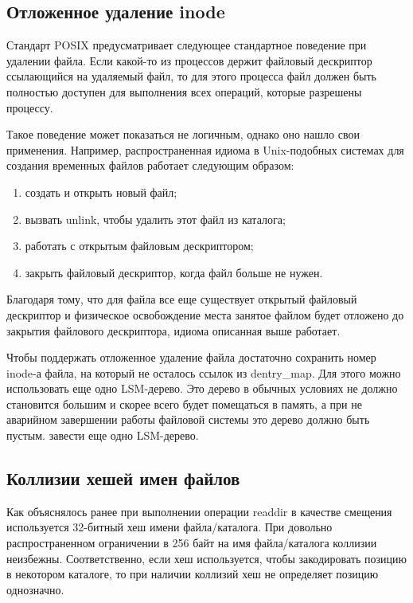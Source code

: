 \subsection{Отложенное удаление inode}

Стандарт POSIX предусматривает следующее стандартное поведение при удалении
файла. Если какой-то из процессов держит файловый дескриптор ссылающийся на
удаляемый файл, то для этого процесса файл должен быть полностью доступен для
выполнения всех операций, которые разрешены процессу.

Такое поведение может показаться не логичным, однако оно нашло свои применения.
Например, распространенная идиома в Unix-подобных системах для создания
временных файлов работает следующим образом:
\begin{enumerate}
  \item создать и открыть новый файл;
  \item вызвать unlink, чтобы удалить этот файл из каталога;
  \item работать с открытым файловым дескриптором;
  \item закрыть файловый дескриптор, когда файл больше не нужен.
\end{enumerate}

Благодаря тому, что для файла все еще существует открытый файловый дескриптор
и физическое освобождение места занятое файлом будет отложено до закрытия
файлового дескриптора, идиома описанная выше работает.

Чтобы поддержать отложенное удаление файла достаточно сохранить номер inode-а
файла, на который не осталось ссылок из dentry\_map. Для этого можно
использовать еще одно LSM-дерево. Это дерево в обычных условиях не должно
становится большим и скорее всего будет помещаться в память, а при не аварийном
завершении работы файловой системы это дерево должно быть пустым.
завести еще одно LSM-дерево.


\subsection{Коллизии хешей имен файлов}

Как объяснялось ранее при выполнении операции readdir в качестве смещения
используется 32-битный хеш имени файла/каталога. При довольно распространенном
ограничении в 256 байт на имя файла/каталога коллизии неизбежны. Соответственно,
если хеш используется, чтобы закодировать позицию в некотором каталоге, то при
наличии коллизий хеш не определяет позицию однозначно.

